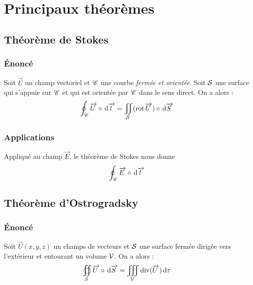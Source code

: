 \chapter{Principaux théorèmes}
\section{Théorème de Stokes}
\subsection{Énoncé}
Soit $\vec{U}$ un champ vectoriel et $\mathscr{C}$ une courbe \emph{fermée et orientée}. Soit $\mathcal{S}$ une surface qui s'appuie sur $\mathscr{C}$ et qui est orientée par $\mathscr{C}$ dans le sens direct. On a alors :
\[
\oint_\mathscr{C}\overrightarrow{U\:}\circ\,\mathrm{d}\overrightarrow{l\:} = \iint_\mathcal{S}(\operatorname{rot}\overrightarrow{U\:})\circ\,\mathrm{d}\overrightarrow{S\:}
\]

\subsection{Applications}
Appliqué au champ $\vec{E}$, le théorème de Stokes nous donne
\[\oint_\mathscr{C}\overrightarrow{E\:}\circ\,\mathrm{d}\overrightarrow{l\:}\]

\section{Théorème d'Ostrogradsky}
\subsection{Énoncé}
Soit $\vec{U}(x,y,z)$ un champs de vecteurs et $\mathcal{S}$ une surface fermée dirigée vers l’extérieur et entourant un volume $\mathcal{V}$. On a alors :
\[
\oiint_\mathcal{S}\overrightarrow{U\:}\circ\,\mathrm{d}\overrightarrow{S\:} = \iiint_\mathcal{V}\operatorname{div}(\overrightarrow{U\:})\,\mathrm{d}\tau
\]